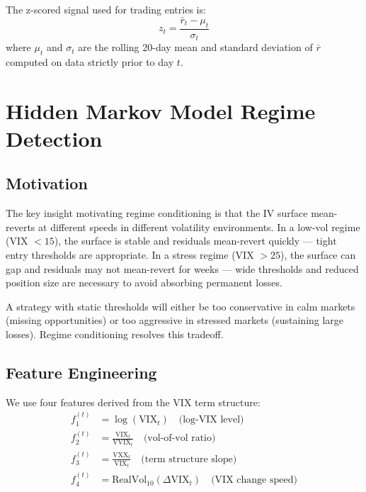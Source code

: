 \documentclass[12pt, letterpaper]{article}
\begin{document}
The z-scored signal used for trading entries is:
\begin{equation}
  z_t = \frac{\bar{r}_t - \mu_t}{\sigma_t}
  \label{eq:zscore}
\end{equation}
where $\mu_t$ and $\sigma_t$ are the rolling 20-day mean and standard deviation
of $\bar{r}$ computed on data strictly prior to day $t$.

\section{Hidden Markov Model Regime Detection}
\label{sec:hmm}

\subsection{Motivation}

The key insight motivating regime conditioning is that the IV surface
mean-reverts at different speeds in different volatility environments.
In a low-vol regime (VIX $< 15$), the surface is stable and residuals
mean-revert quickly — tight entry thresholds are appropriate. In a stress
regime (VIX $> 25$), the surface can gap and residuals may not mean-revert
for weeks — wide thresholds and reduced position size are necessary to
avoid absorbing permanent losses.

A strategy with static thresholds will either be too conservative in calm
markets (missing opportunities) or too aggressive in stressed markets
(sustaining large losses). Regime conditioning resolves this tradeoff.

\subsection{Feature Engineering}

We use four features derived from the VIX term structure:
\begin{align}
  f_1^{(t)} &= \log(\text{VIX}_t) \quad \text{(log-VIX level)} \label{eq:f1}\\
  f_2^{(t)} &= \frac{\text{VIX}_t}{\text{VVIX}_t} \quad \text{(vol-of-vol ratio)} \label{eq:f2}\\
  f_3^{(t)} &= \frac{\text{VXX}_t}{\text{VIX}_t} \quad \text{(term structure slope)} \label{eq:f3}\\
  f_4^{(t)} &= \text{RealVol}_{10}(\Delta\text{VIX}_t) \quad \text{(VIX change speed)} \label{eq:f4}
\end{align}
\end{document}
